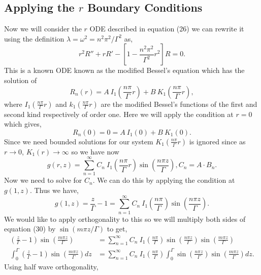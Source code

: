 \documentclass[11pt,letterpaper]{article}
\newcommand{\fpar}[1]{\left({#1}\right)} %
\newcommand{\fbrac}[1]{\left[{#1}\right]} %
\begin{document}
\subsection{Applying the $r$ Boundary Conditions}
Now we will consider the $r$ ODE described in equation (26) we can rewrite it using the definition $\lambda = \omega^2 = n^2\pi^2/\Gamma^2$ as,
\begin{equation}
    r^2R''+rR' -\fbrac{1 - \frac{n^2\pi^2}{\Gamma^2}r^2}R = 0.
\end{equation}
This is a known ODE known as the modified Bessel's equation which has the solution of 
\begin{equation*}
    R_n (r) = A\ I_1\fpar{\frac{n\pi}{\Gamma}r}+B\ K_1\fpar{\frac{n\pi}{\Gamma}r}, 
\end{equation*}
where $I_1(\frac{n\pi}{\Gamma}r)$ and $k_1(\frac{n\pi}{\Gamma}r)$ are the modified Bessel's functions of the first and second kind respectively of order one. Here we will apply the condition at $r=0$ which gives,
\begin{equation*}
    R_n(0) = 0 = A\ I_1(0) + B\ K_1(0).
\end{equation*}
Since we need bounded solutions for our system $K_1(\frac{n\pi}{\Gamma}r)$ is ignored since as $r\to0$, $K_1(r)\to\infty$ so we have now \begin{equation}
    g(r,z) = \sum_{n=1}^\infty C_n\ I_1\fpar{\frac{n\pi}{\Gamma}r}\sin\fpar{\frac{n\pi z}{\Gamma}}, C_n = A\cdot B_n.
\end{equation}  
Now we need to solve for $C_n$. We can do this by applying the condition at $g(1,z)$. Thus we have,
\begin{equation}
    g(1,z)= \frac{z}{\Gamma}-1 = \sum_{n=1}^\infty C_n\ I_1\fpar{\frac{n\pi}{\Gamma}}\sin\fpar{\frac{n\pi z}{\Gamma}}.
\end{equation}
We would like to apply orthogonality to this so we will multiply both sides of equation (30) by $\sin\fpar{m\pi z/\Gamma}$ to get, 
\begin{align}
    \fpar{\frac{z}{\Gamma} -1}\sin\fpar{\frac{m\pi z}{\Gamma}} &= \sum_{n=1}^\infty C_n\ I_1\fpar{\frac{n\pi}{\Gamma}}\sin\fpar{\frac{n\pi z}{\Gamma}}\sin\fpar{\frac{m\pi z}{\Gamma}}\nonumber\\
    \int_{0}^{\Gamma}{\fpar{\frac{z}{\Gamma} -1}\sin\fpar{\frac{m\pi z}{\Gamma}}}dz &= \sum_{n=1}^\infty C_n\ I_1\fpar{\frac{n\pi}{\Gamma}} \int_{0}^{\Gamma}{\sin\fpar{\frac{n\pi z}{\Gamma}}\sin\fpar{\frac{m\pi z}{\Gamma}}}dz.
\end{align}
Using half wave orthogonality,
\end{document}
